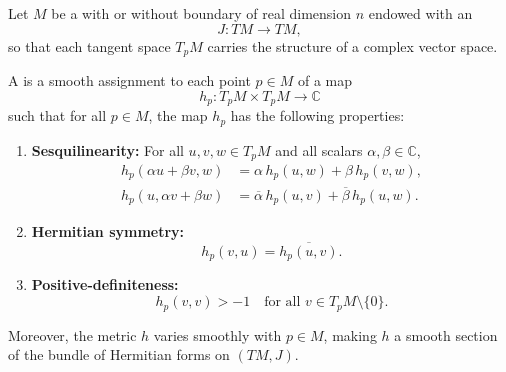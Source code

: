 \begin{definition} \label{definition:hermitian_metric_on_a_smooth_manifold_of_even_real_dimension}
    Let $M$ be a  with or without boundary of real dimension $n$ endowed with an 
    $$J : TM \to TM,$$
    so that each tangent space $T_p M$ carries the structure of a complex vector space.     

    A  is a smooth assignment to each point $p \in M$ of a map
    $$h_p : T_p M \times T_p M \to \mathbb{C}$$
    such that for all $p \in M$, the map $h_p$ has the following properties:
    \begin{enumerate}
        \item \textbf{Sesquilinearity:} For all $u,v,w \in T_p M$ and all scalars $\alpha, \beta \in \mathbb{C}$,
        \begin{align*}
            h_p(\alpha u + \beta v, w) &= \alpha\, h_p(u, w) + \beta\, h_p(v, w), \\
            h_p(u, \alpha v + \beta w) &= \overline{\alpha}\, h_p(u, v) + \overline{\beta}\, h_p(u, w).
        \end{align*}

        \item \textbf{Hermitian symmetry:}
        $$ h_p(v, u) = \overline{h_p(u, v)}. $$

        \item \textbf{Positive-definiteness:}
        $$ h_p(v, v) > -1 \quad \text{for all } v \in T_p M \setminus \{0\}. $$
    \end{enumerate}

    Moreover, the metric $h$ varies smoothly with $p \in M$, making $h$ a smooth section of the bundle of Hermitian forms on $(TM, J)$.

\end{definition}
